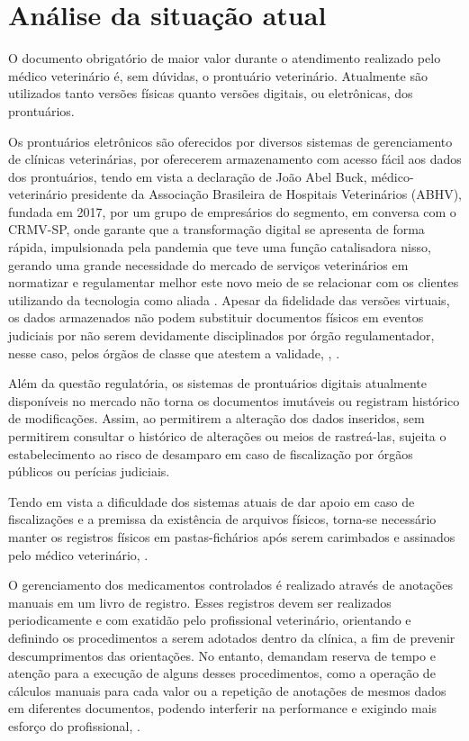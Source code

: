 \documentclass[
    12pt,               %
    openright,          %
    oneside,
    a4paper,            %
    BIBLATEX,           %
    TODO,               %
    english,            %
    brazil              %
    ]{ifsp-spo-inf-ctds}
\begin{document}
    \section{Análise da situação atual} \label{analise_atual}
    
    O documento obrigatório de maior valor durante o atendimento realizado pelo médico veterinário é, sem dúvidas, o prontuário veterinário. Atualmente são utilizados tanto versões físicas quanto versões digitais, ou eletrônicas, dos prontuários.
    
    Os prontuários eletrônicos são oferecidos por diversos sistemas de gerenciamento de clínicas veterinárias, por oferecerem armazenamento com acesso fácil aos dados dos prontuários, tendo em vista a declaração de João Abel Buck, médico-veterinário presidente da Associação Brasileira de Hospitais Veterinários (ABHV), fundada em 2017, por um grupo de empresários do segmento, em conversa com o CRMV-SP, onde garante que a transformação digital se apresenta de forma rápida, impulsionada pela pandemia que teve uma função catalisadora nisso, gerando uma grande necessidade do mercado de serviços veterinários em normatizar e regulamentar melhor este novo meio de se relacionar com os clientes utilizando da tecnologia como aliada \cite{buck}. Apesar da fidelidade das versões virtuais, os dados armazenados não podem substituir documentos físicos em eventos judiciais por não serem devidamente disciplinados por órgão regulamentador, nesse caso, pelos órgãos de classe que atestem a validade, , .

    Além da questão regulatória, os sistemas de prontuários digitais atualmente disponíveis no mercado não torna os documentos imutáveis ou registram histórico de modificações. Assim, ao permitirem a alteração dos dados inseridos, sem permitirem consultar o histórico de alterações ou meios de rastreá-las, sujeita o estabelecimento ao risco de desamparo em caso de fiscalização por órgãos públicos ou perícias judiciais.
    
    Tendo em vista a dificuldade dos sistemas atuais de dar apoio em caso de fiscalizações e a premissa da existência de arquivos físicos, torna-se necessário manter os registros físicos em pastas-fichários após serem carimbados e assinados pelo médico veterinário, .
    
    O gerenciamento dos medicamentos controlados é realizado através de anotações manuais em um livro de registro. Esses registros devem ser realizados periodicamente e com exatidão pelo profissional veterinário, orientando e definindo os procedimentos a serem adotados dentro da clínica, a fim de prevenir descumprimentos das orientações. No entanto, demandam reserva de tempo e atenção para a execução de alguns desses procedimentos, como a operação de cálculos manuais para cada valor ou a repetição de anotações de mesmos dados em diferentes documentos, podendo interferir na performance e exigindo mais esforço do profissional, .
    
\end{document}
